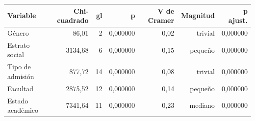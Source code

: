 \begin{tabular}{lrrrrrr}
\toprule
\textbf{Variable} & \textbf{Chi-cuadrado} & \textbf{gl} & \textbf{p} & \textbf{V de Cramer} & \textbf{Magnitud} & \textbf{p ajust.} \\
\midrule
Género & 86,01 & 2 & 0,000000 & 0,02 & trivial & 0,000000 \\
Estrato social & 3134,68 & 6 & 0,000000 & 0,15 & pequeño & 0,000000 \\
Tipo de admisión & 877,72 & 14 & 0,000000 & 0,08 & trivial & 0,000000 \\
Facultad & 2875,52 & 12 & 0,000000 & 0,14 & pequeño & 0,000000 \\
Estado académico & 7341,64 & 11 & 0,000000 & 0,23 & mediano & 0,000000 \\
\bottomrule
\end{tabular}